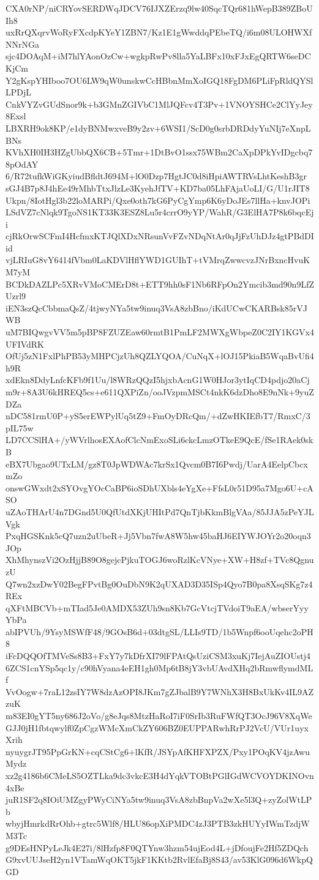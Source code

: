 CXA0rNP/niCRYovSERDWqJDCV76IJXZErzq9lw40SqcTQr681hWepB389ZBoUIh8
uxRrQXqrvWoRyFXcdpKYeY1ZBN7/Kz1E1gWwddqPEbeTQ/i6m08ULOHWXfNNrNGa
sjc4DOAqM+iM7hlYAonOzCw+wgkpRwPv8lla5YaLBFx10xFJxEgQRTW6seDCKjCm
Y2gKspYHIboo7OU6LW9qW0unskwCcHBbnMmXoIGQ18FgDM6PLiFpRldQYSlLPDjL
CnkVYZvGUdSnor9k+b3GMnZGIVbC1MlJQFcv4T3Pv+1VNOYSHCe2ClYyJey8Exsl
LBXRH9ok8KP/e1dyBNMwxveB9y2zv+6WSI1/ScD0g0srbDRDdyYuNIj7eXnpLBNs
KVhXH0IH3HZgUbbQX6CB+5Tmr+1DtBvO1ssx75WBm2CaXpDPkYvIDgcbq78pOdAY
6/R72tufkWiGKyiudBfldtJ694M+lO0Dzp7HgtJC0d8iHpiAWTRVsLhtKeshB3gr
sGJ4B7p8J4hEe49rMhbTtxJlzLe3KyehJfTV+KD7ba05LhFAjaUoLI/G/U1rJIT8
Ukpn/8IotHgl3b22loMARPi/Qxe0oth7kG6PyCgYmp6K6yDoJEs7llHa+knvJOPi
LSdVZ7cNlqk9TgoNS1KT33K3ESZ8Lu5r4crrO9yYP/WahR/G3ElHA7P8k6bqcEji
cjRkOrwSCFmI4HcfmxKTJQlXDxNRsunVvFZvNDqNtAr0qJjFzUhDJz4gtPBdDIid
vjLRIuG8vY6414fVbm0LaKDVlHflYWD1GUIhT+tVMrqZwwcvzJNrBxncHvuKM7yM
BCDkDAZLPc5XRvVMoCMErD8t+ETT9hh0sF1Nb6RFpOn2Ymcib3md90n9LfZUzrl9
iEN3szQcCbbmaQsZ/4tjwyNYa5tw9inuq3VsA8zbBno/iKdUCwCKARBsk85rVJWB
uM7BIQwgvVV5m5pBP8FZUZEaw60rmtB1PmLF2MWXgWbpeZ0C2IY1KGVx4UFIVdRK
OfUj5zN1FxlPhPB53yMHPCjzUh8QZLYQOA/CuNqX+lOJ15PkiaB5WqaBvUfi4h9R
xdEkn8DdyLnfcKFb9f1Uu/l8WRzQQzI5hjxbAcnG1W0HJor3ytIqCD4pdjo20aCj
m9r+8A3U6kHREQ5cs+e611QXPiZn/ooJVzpmMSCt4nkK6dzDho8E9nNk+9yuZDZa
nDC581rmU0P+yS5erEWPylUq5tZ9+FmOyDRcQm/+dZwHKIEfbT7/RmxC/3pIL75w
LD7CCSlHA+/yWVrlhosEXAofClcNmExoSLi6ckcLmzOTkeE9QcE/fSe1RAek0skB
eBX7Ubgao9UTxLM/gz8T0JpWDWAc7krSx1Qvcm0B7I6Pwdj/UarA4EelpCbcxmZo
onswGWxdt2xSYOvgYOcCaBP6ioSDhUXbls4eYgXe+FfsL0r51D95a7Mgo6U+cASO
uZAoTHArU4n7DGnd5U0QfUtdXKjUHItPd7QnTjbKkmBlgVAa/85JJA5zPeYJLVgk
PxqHGSKnk5cQ7uzn2uUbeR+Jj5Vbn7fwA8W5hw45baHJ6EIYWJOYr2o20oqn3JOp
XhMhynszVi2OzHjjB89O8gejcPjkuTOGJ6woRzlKcVNye+XW+H8zf+TVc8QgnuzU
Q7wn2xzDwY02BegFPvtBg0OuDbN9K2qUXAD3D35ISp4Qyo7B0pa8XsqSKg7z4REx
qXFtMBCVb+mTIad5Je0AMDX53ZUh9sn8Kb7GcVtcjTVdoiT9aEA/wbserYyyYbPa
abIPVUh/9YsyMSWfF48/9GOsB6d+03dtgSL/LLIs9TD/1b5Wnpf6ooUqehc2oPH8
iFcDQQOfTMVeSs8B3+FxY7y7kDfrXI79lFPAtQsUziCSM3xuKj7IejAuZIOUstj4
6ZCS1cnYSp5qc1y/c90hVyana4eEH1gh0Mp6tB8jY3vbUAvdXHq2bRmwflymdMLf
VvOogw+7raL12zsIY7W8dzAzOPI8JKm7gZJbalB9Y7WNhX3H8BxUkKv4IL9AZzuK
m83EI0gYT5ny686J2oVo/g8eJqs8MtzHaRoI7iF0SrIb3RuFWfQT3OcJ96V8XqWe
GJJ0jH1fbtqwylf0ZpCgzWMcXmCkZY606BZ0EUPPARwhRrPJ2VcU/VUr1uyxXrih
nyuygrJT95PpGrKN+cqCStCg6+lKfR/JSYpAfKHFXPZX/Pxy1POqKV4jzAwuMydz
xz2g4186b6CMeLS5OZTLka9dc3vkcE3H4dYqkVTOBtPGlIGdWCVOYDKINOvn4xBe
juR1SF2q8IOiUMZgyPWyCiNYa5tw9inuq3VsA8zbBnpVa2wXe5l3Q+zyZolWtLPb
wbyjHmrkdRrOhb+gtrc5Wlf8/HLU86opXiPMDC4zJ3PTB3zkHUYyIWmTzdjWM3Tc
g9DEsHNPyLeJk4E27i/8lHzfp8F0QTYnw3hzm54ujEod4L+jDfoujFe2Hf5ZDQch
G9xvUUJseH2yn1VTamWqOKT5jkF1KKtb2RvlEfaBj8S43/av53KlG096d6WkpQGD
